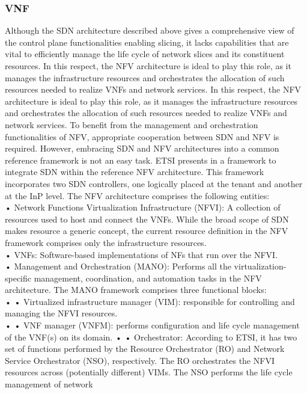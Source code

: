 \documentclass{article}
\begin{document}
\subsubsection{VNF}
Although the SDN architecture described above
gives a comprehensive view of the control plane
functionalities enabling slicing, it lacks capabilities
that are vital to efficiently manage the life cycle of
network slices and its constituent resources. In this
respect, the NFV architecture is ideal to play
this role, as it manages the infrastructure resources
and orchestrates the allocation of such resources
needed to realize VNFs and network services.
In this respect, the NFV architecture is ideal to play
this role, as it manages the infrastructure resources
and orchestrates the allocation of such resources
needed to realize VNFs and network services.
To benefit from the management and orchestration functionalities of NFV, appropriate cooperation between SDN and NFV is required.
However, embracing SDN and NFV architectures
into a common reference framework is not an
easy task. ETSI presents in \cite{etsi2015gs} a framework
to integrate SDN within the reference NFV architecture. This framework incorporates two SDN
controllers, one logically placed at the tenant and
another at the InP level. The NFV architecture comprises the following
entities:\\
• Network Functions Virtualization Infrastructure (NFVI): A collection of resources used to
host and connect the VNFs. While the broad
scope of SDN makes resource a generic concept,
the current resource definition in the NFV framework comprises only the infrastructure resources.\\
• VNFs: Software-based implementations of NFs
that run over the NFVI.\\
• Management and Orchestration (MANO):
Performs all the virtualization-specific management, coordination, and automation tasks in the
NFV architecture. The MANO framework
comprises three functional blocks:\\
• • Virtualized infrastructure manager (VIM):
responsible for controlling and managing the
NFVI resources.\\
• • VNF manager (VNFM): performs configuration and life cycle management of the
VNF(s) on its domain.
• • Orchestrator: According to ETSI, it has two
set of functions performed by the Resource
Orchestrator (RO) and Network Service
Orchestrator (NSO), respectively. The RO
orchestrates the NFVI resources across
(potentially different) VIMs. The NSO performs the life cycle management of network
\end{document}
